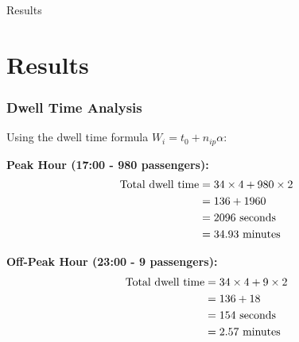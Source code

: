 \documentclass[12pt]{beamer}
\begin{document}
\begin{frame}
\begin{center}
\Huge{Results}
\end{center}
\end{frame}

\section{Results}

\begin{frame}
\frametitle{Dwell Time Analysis}
Using the dwell time formula $W_i = t_0 + n_{ip}\alpha$:

\vspace{0.5cm}
\textbf{Peak Hour (17:00 - 980 passengers):}
\begin{align}
\text{Total dwell time} &= 34 \times 4 + 980 \times 2 \notag\\
&= 136 + 1960 \notag\\
&= 2096 \text{ seconds} \notag\\
&= 34.93 \text{ minutes} \notag
\end{align}

\vspace{0.5cm}
\textbf{Off-Peak Hour (23:00 - 9 passengers):}
\begin{align}
\text{Total dwell time} &= 34 \times 4 + 9 \times 2 \notag\\
&= 136 + 18 \notag\\
&= 154 \text{ seconds} \notag\\
&= 2.57 \text{ minutes} \notag
\end{align}
\end{frame}
\end{document}
